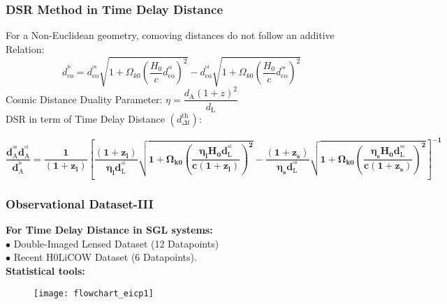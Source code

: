 \documentclass[10pt,xcolor={dvipsnames}]{beamer}
\begin{document}
 \begin{frame}
 \frametitle{DSR Method in Time Delay Distance}
 \vspace{3mm}
   For a Non-Euclidean geometry, comoving distances do not follow an additive Relation:
  $$
  d_{c o}^{^{\mathrm{ls}}}= d_\mathrm{c o}^{^\mathrm{os}} \sqrt{1+\Omega_{k0} \left(\dfrac{H_0}{c}d_\mathrm{c o}^\mathrm{^{ol}}\right)^{2}}-d_\mathrm{c o}^{^\mathrm{ol} }\sqrt{1+\Omega_{k0}\left(\dfrac{H_0}{c} d_\mathrm{c o}^{^\mathrm{os}}\right)^{2}}
  $$
    Cosmic Distance Duality Parameter: $\eta=\dfrac{d_\mathrm{A}(1+z)^{2}}{d_\mathrm{L}}$
  \vspace{3mm}\\
  DSR in term of Time Delay Distance $(d_{\Delta t}^{\mathrm{th}})$:
 \vspace{1mm}\\
\begin{scriptsize}
$$
{\boxed{\boldsymbol{{ \dfrac{d_\mathrm{A}^{^\mathrm{o s}} d_\mathrm{A}^{^\mathrm{o l}}}{d_\mathrm{A}^{^\mathrm{l s}}}=\dfrac{1}{\left(1+z_{l}\right)}\left[\dfrac{\left(1+z_{l}\right)}{\eta_{l} d_\mathrm{L}^{^\mathrm{o l}}} \sqrt{1+\Omega_{k0}\left(\dfrac{\eta_{l} H_{0} d_\mathrm{L}^{^\mathrm{o l}}}{c\left(1+z_{l}\right)}\right)^{2}}-\dfrac{\left(1+z_{s}\right)}{\eta_{s} d_\mathrm{L}^{^\mathrm{o s}}} \sqrt{1+\Omega_{k0}\left(\dfrac{\eta_{s} H_{0} d_\mathrm{L}^{^ \mathrm{os}}}{c\left(1+z_{s}\right)}\right)^{2}}\right]^{-1}\hspace{2cm}}}}}
$$
\end{scriptsize}
\end{frame}
\begin{frame}
 \frametitle{Observational Dataset-III}
 \textbf{For Time Delay Distance in SGL systems:}\\\hspace{1cm} $\bullet$ Double-Imaged Lensed Dataset (12 Datapoints)\\
\hspace{1cm} $\bullet$ Recent H0LiCOW Dataset (6 Datapoints).
 \vspace{2mm}\\
 \textbf{Statistical tools:}
 \begin{figure}[ht!]
\centering
\texttt{[image: flowchart\_eicp1]}
\end{figure} 
 \end{frame}
\end{document}
